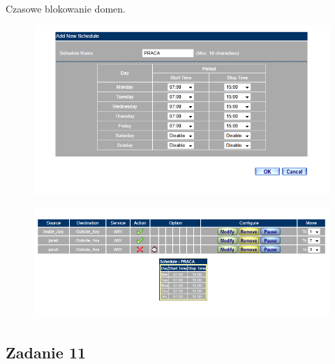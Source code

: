 \documentclass[wide,a4paper,titlepage,12pt] {article}
\begin{document}
  \paragraph{}
  Czasowe blokowanie domen.
  \begin{figure}[h!]
    \begin{center}
      \includegraphics[width=\textwidth]{10.PNG}
    \end{center}
  \end{figure}
  \begin{figure}[h!]
    \begin{center}
      \includegraphics[width=\textwidth]{11.PNG}
    \end{center}
  \end{figure}

  \newpage
  \subsection{Zadanie 11}
\end{document}
